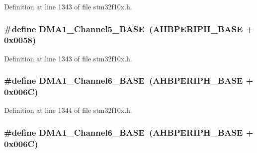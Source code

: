 Definition at line 1343 of file stm32f10x.\+h.

\subsubsection[{\texorpdfstring{D\+M\+A1\+\_\+\+Channel5\+\_\+\+B\+A\+SE}{DMA1_Channel5_BASE}}]{\setlength{\rightskip}{0pt plus 5cm}\#define D\+M\+A1\+\_\+\+Channel5\+\_\+\+B\+A\+SE~({\bf A\+H\+B\+P\+E\+R\+I\+P\+H\+\_\+\+B\+A\+SE} + 0x0058)}\hypertarget{group___peripheral__memory__map_gac041a71cd6c1973964f847a68aa14478}{}\label{group___peripheral__memory__map_gac041a71cd6c1973964f847a68aa14478}


Definition at line 1343 of file stm32f10x.\+h.

\subsubsection[{\texorpdfstring{D\+M\+A1\+\_\+\+Channel6\+\_\+\+B\+A\+SE}{DMA1_Channel6_BASE}}]{\setlength{\rightskip}{0pt plus 5cm}\#define D\+M\+A1\+\_\+\+Channel6\+\_\+\+B\+A\+SE~({\bf A\+H\+B\+P\+E\+R\+I\+P\+H\+\_\+\+B\+A\+SE} + 0x006\+C)}\hypertarget{group___peripheral__memory__map_ga896c2c7585dd8bc3969cf8561f689d2d}{}\label{group___peripheral__memory__map_ga896c2c7585dd8bc3969cf8561f689d2d}


Definition at line 1344 of file stm32f10x.\+h.

\subsubsection[{\texorpdfstring{D\+M\+A1\+\_\+\+Channel6\+\_\+\+B\+A\+SE}{DMA1_Channel6_BASE}}]{\setlength{\rightskip}{0pt plus 5cm}\#define D\+M\+A1\+\_\+\+Channel6\+\_\+\+B\+A\+SE~({\bf A\+H\+B\+P\+E\+R\+I\+P\+H\+\_\+\+B\+A\+SE} + 0x006\+C)}\hypertarget{group___peripheral__memory__map_ga896c2c7585dd8bc3969cf8561f689d2d}{}\label{group___peripheral__memory__map_ga896c2c7585dd8bc3969cf8561f689d2d}


